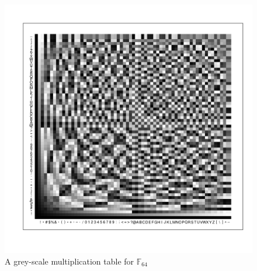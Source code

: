 \documentclass{article}
\begin{document}
	\begin{figure}
	\centering
	\includegraphics[height=\textheight,center]{GreyScaleTable}
	\caption{A grey-scale multiplication table for $\mathbb{F}_{64}$}
	\label{fig:GreyTable}
	\end{figure}
\end{document}
